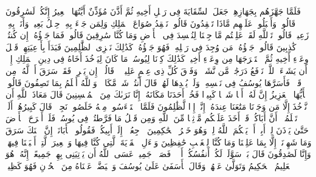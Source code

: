 \stopbuffer
\startbuffer[\q:12:70]
فَلَمَّا جَهَّزَهُم بِجَهَازِهِمۡ جَعَلَ ٱلسِّقَایَةَ فِی رَحۡلِ أَخِیهِ ثُمَّ أَذَّنَ مُؤَذِّنٌ أَیَّتُهَا ٱلۡعِیرُ إِنَّكُمۡ لَسَٰرِقُونَ%
\stopbuffer
\startbuffer[\q:12:71]
قَالُوا۟ وَأَقۡبَلُوا۟ عَلَیۡهِم مَّاذَا تَفۡقِدُونَ%
\stopbuffer
\startbuffer[\q:12:72]
قَالُوا۟ نَفۡقِدُ صُوَاعَ ٱلۡمَلِكِ وَلِمَن جَاۤءَ بِهِۦ حِمۡلُ بَعِیرࣲ وَأَنَا۠ بِهِۦ زَعِیمࣱ%
\stopbuffer
\startbuffer[\q:12:73]
قَالُوا۟ تَٱللَّهِ لَقَدۡ عَلِمۡتُم مَّا جِئۡنَا لِنُفۡسِدَ فِی ٱلۡأَرۡضِ وَمَا كُنَّا سَٰرِقِینَ%
\stopbuffer
\startbuffer[\q:12:74]
قَالُوا۟ فَمَا جَزَٰۤؤُهُۥۤ إِن كُنتُمۡ كَٰذِبِینَ%
\stopbuffer
\startbuffer[\q:12:75]
قَالُوا۟ جَزَٰۤؤُهُۥ مَن وُجِدَ فِی رَحۡلِهِۦ فَهُوَ جَزَٰۤؤُهُۥۚ كَذَٰلِكَ نَجۡزِی ٱلظَّٰلِمِینَ%
\stopbuffer
\startbuffer[\q:12:76]
فَبَدَأَ بِأَوۡعِیَتِهِمۡ قَبۡلَ وِعَاۤءِ أَخِیهِ ثُمَّ ٱسۡتَخۡرَجَهَا مِن وِعَاۤءِ أَخِیهِۚ كَذَٰلِكَ كِدۡنَا لِیُوسُفَۖ مَا كَانَ لِیَأۡخُذَ أَخَاهُ فِی دِینِ ٱلۡمَلِكِ إِلَّاۤ أَن یَشَاۤءَ ٱللَّهُۚ نَرۡفَعُ دَرَجَٰتࣲ مَّن نَّشَاۤءُۗ وَفَوۡقَ كُلِّ ذِی عِلۡمٍ عَلِیمࣱ%
\stopbuffer
\startbuffer[\q:12:77]
۞ قَالُوۤا۟ إِن یَسۡرِقۡ فَقَدۡ سَرَقَ أَخࣱ لَّهُۥ مِن قَبۡلُۚ فَأَسَرَّهَا یُوسُفُ فِی نَفۡسِهِۦ وَلَمۡ یُبۡدِهَا لَهُمۡۚ قَالَ أَنتُمۡ شَرࣱّ مَّكَانࣰاۖ وَٱللَّهُ أَعۡلَمُ بِمَا تَصِفُونَ%
\stopbuffer
\startbuffer[\q:12:78]
قَالُوا۟ یَٰۤأَیُّهَا ٱلۡعَزِیزُ إِنَّ لَهُۥۤ أَبࣰا شَیۡخࣰا كَبِیرࣰا فَخُذۡ أَحَدَنَا مَكَانَهُۥۤۖ إِنَّا نَرَىٰكَ مِنَ ٱلۡمُحۡسِنِینَ%
\stopbuffer
\startbuffer[\q:12:79]
قَالَ مَعَاذَ ٱللَّهِ أَن نَّأۡخُذَ إِلَّا مَن وَجَدۡنَا مَتَٰعَنَا عِندَهُۥۤ إِنَّاۤ إِذࣰا لَّظَٰلِمُونَ%
\stopbuffer
\startbuffer[\q:12:80]
فَلَمَّا ٱسۡتَیۡءَسُوا۟ مِنۡهُ خَلَصُوا۟ نَجِیࣰّاۖ قَالَ كَبِیرُهُمۡ أَلَمۡ تَعۡلَمُوۤا۟ أَنَّ أَبَاكُمۡ قَدۡ أَخَذَ عَلَیۡكُم مَّوۡثِقࣰا مِّنَ ٱللَّهِ وَمِن قَبۡلُ مَا فَرَّطتُمۡ فِی یُوسُفَۖ فَلَنۡ أَبۡرَحَ ٱلۡأَرۡضَ حَتَّىٰ یَأۡذَنَ لِیۤ أَبِیۤ أَوۡ یَحۡكُمَ ٱللَّهُ لِیۖ وَهُوَ خَیۡرُ ٱلۡحَٰكِمِینَ%
\stopbuffer
\startbuffer[\q:12:81]
ٱرۡجِعُوۤا۟ إِلَىٰۤ أَبِیكُمۡ فَقُولُوا۟ یَٰۤأَبَانَاۤ إِنَّ ٱبۡنَكَ سَرَقَ وَمَا شَهِدۡنَاۤ إِلَّا بِمَا عَلِمۡنَا وَمَا كُنَّا لِلۡغَیۡبِ حَٰفِظِینَ%
\stopbuffer
\startbuffer[\q:12:82]
وَسۡءَلِ ٱلۡقَرۡیَةَ ٱلَّتِی كُنَّا فِیهَا وَٱلۡعِیرَ ٱلَّتِیۤ أَقۡبَلۡنَا فِیهَاۖ وَإِنَّا لَصَٰدِقُونَ%
\stopbuffer
\startbuffer[\q:12:83]
قَالَ بَلۡ سَوَّلَتۡ لَكُمۡ أَنفُسُكُمۡ أَمۡرࣰاۖ فَصَبۡرࣱ جَمِیلٌۖ عَسَى ٱللَّهُ أَن یَأۡتِیَنِی بِهِمۡ جَمِیعًاۚ إِنَّهُۥ هُوَ ٱلۡعَلِیمُ ٱلۡحَكِیمُ%
\stopbuffer
\startbuffer[\q:12:84]
وَتَوَلَّىٰ عَنۡهُمۡ وَقَالَ یَٰۤأَسَفَىٰ عَلَىٰ یُوسُفَ وَٱبۡیَضَّتۡ عَیۡنَاهُ مِنَ ٱلۡحُزۡنِ فَهُوَ كَظِیمࣱ%
\stopbuffer
